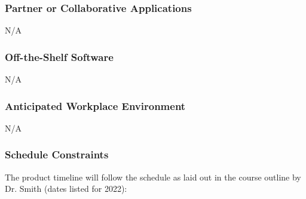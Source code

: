 \documentclass[12pt]{article}
\begin{document}
\subsubsection{Partner or Collaborative Applications}
N/A
\subsubsection{Off-the-Shelf Software}
N/A
\subsubsection{Anticipated Workplace Environment}
N/A
\subsubsection{Schedule Constraints}
The product timeline will follow the schedule as laid out in the course outline by Dr. Smith (dates listed for 2022):
\end{document}
